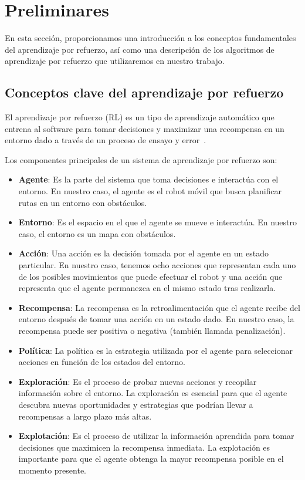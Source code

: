 \documentclass[conference,a4paper]{IEEEtran}
\begin{document}
\section{Preliminares}

En esta sección, proporcionamos una introducción a los conceptos fundamentales del aprendizaje por refuerzo,
así como una descripción de los algoritmos de aprendizaje por refuerzo que utilizaremos en nuestro trabajo.

\subsection{Conceptos clave del aprendizaje por refuerzo}

El aprendizaje por refuerzo (RL) es un tipo de aprendizaje automático que entrena al software para tomar decisiones y maximizar una recompensa en un entorno dado a través de 
un proceso de ensayo y error~\cite{b7}.\newline

Los componentes principales de un sistema de aprendizaje por refuerzo son:

\begin{itemize}
  \item \textbf{Agente}: Es la parte del sistema que toma decisiones e interactúa con el entorno. En nuestro caso, el agente es el robot móvil que busca planificar rutas en un entorno con obstáculos.
  \item \textbf{Entorno}: Es el espacio en el que el agente se mueve e interactúa. En nuestro caso, el entorno es un mapa con obstáculos.
  \item \textbf{Acción}: Una acción es la decisión tomada por el agente en un estado particular. En nuestro caso, tenemos ocho acciones que representan cada uno de los posibles movimientos que puede efectuar el robot y una 
    acción que representa que el agente permanezca en el mismo estado tras realizarla.
  \item \textbf{Recompensa}: La recompensa es la retroalimentación que el agente recibe del entorno después de tomar una acción en un estado dado. En nuestro caso, la recompensa puede ser positiva o negativa (también llamada penalización).
  \item \textbf{Política}: La política es la estrategia utilizada por el agente para seleccionar acciones en función de los estados del entorno. 
  \item \textbf{Exploración}: Es el proceso de probar nuevas acciones y recopilar información sobre el entorno. La exploración es esencial para que el agente descubra nuevas oportunidades y estrategias que podrían llevar a recompensas a largo plazo más altas.
  \item \textbf{Explotación}: Es el proceso de utilizar la información aprendida para tomar decisiones que maximicen la recompensa inmediata. La explotación es importante para que el agente obtenga la mayor recompensa posible en el momento presente.
\end{itemize}
\end{document}
